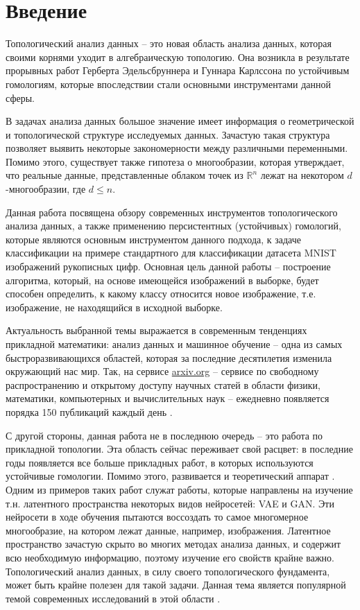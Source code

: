 \chapter*{\centering Введение}

Топологический анализ данных -- это новая область анализа данных, которая своими корнями уходит в алгебраическую топологию. Она возникла в результате прорывных работ Герберта Эдельсбруннера \cite{Edelsbrunner} и Гуннара Карлссона \cite{Zomorodian} по устойчивым гомологиям, которые впоследствии стали основными инструментами данной сферы. 

В задачах анализа данных большое значение имеет информация о геометрической и топологической структуре исследуемых данных. Зачастую такая структура позволяет выявить некоторые закономерности между различными переменными. Помимо этого, существует также гипотеза о многообразии, которая утверждает, что реальные данные, представленные облаком точек из $\mathbb{R}^n$ лежат на некотором $d$-многообразии, где $d \leq n$. \

Данная работа посвящена обзору современных инструментов топологического анализа данных, а также применению персистентных (устойчивых) гомологий, которые являются основным инструментом данного подхода, к задаче классификации на примере стандартного для классификации датасета MNIST изображений рукописных цифр. Основная цель данной работы -- построение алгоритма, который, на основе имеющейся изображений в выборке, будет способен определить, к какому классу относится новое изображение, т.е. изображение, не находящийся в исходной выборке. 

Актуальность выбранной темы выражается в современным тенденциях прикладной математики: анализ данных и машинное обучение -- одна из самых быстроразвивающихся областей, которая за последние десятилетия изменила окружающий нас мир. Так, на сервисе \url{arxiv.org} -- сервисе по свободному распространению и открытому доступу научных статей в области физики, математики, компьютерных и вычислительных наук -- ежедневно появляется порядка 150 публикаций каждый день \cite{arxiv-recent-ml}. 

С другой стороны, данная работа не в последнюю очередь -- это работа по прикладной топологии. Эта область сейчас переживает свой расцвет: в последние годы появляется все больше прикладных работ, в которых используются устойчивые гомологии. Помимо этого, развивается и теоретический аппарат \cite{Manin}. Одним из примеров таких работ служат работы, которые направлены на изучение т.н. латентного пространства некоторых видов нейросетей: VAE и GAN. Эти нейросети в ходе обучения пытаются воссоздать то самое многомерное многообразие, на котором лежат данные, например, изображения. Латентное пространство зачастую скрыто во многих методах анализа данных, и содержит всю необходимую информацию, поэтому изучение его свойств крайне важно. Топологический анализ данных, в силу своего топологического фундамента, может быть крайне полезен для такой задачи. Данная тема является популярной темой современных исследований в этой области \cite{topae, charlier2019phomgem, schiff2021characterizing, topogan}. 

